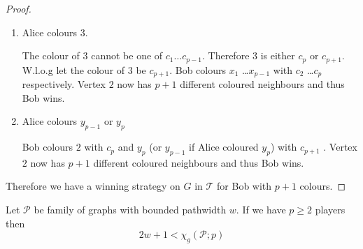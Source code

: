 \begin{proof}
\begin{enumerate}
        \item Alice colours $3$.
               
        The colour of $3$ cannot be one of $c_1 \ldots c_{p-1}$. Therefore $3$ is either $c_p$ or $c_{p+1}$. 
        W.l.o.g let the colour of $3$ be $c_{p+1}$.
        Bob colours $x_1$ \ldots $x_{p-1}$ with $c_2$ \ldots $c_{p}$ respectively.
        Vertex $2$ now has $p+1$ different coloured neighbours and thus Bob wins.  
                       
        \item Alice colours $y_{p-1}$ or $y_{p}$
        
        Bob colours $2$ with $c_p$ and $y_{p}$ (or $y_{p-1}$ if Alice coloured $y_p$) with $c_{p+1}$ .
        Vertex $2$ now has $p+1$ different coloured neighbours and thus Bob wins. 
    \end{enumerate}

    Therefore we have a winning strategy on $G$ in $\mathcal{T}$ for Bob with $p+1$ colours. 
\end{proof}

\begin{theorem}
    Let $\mathcal{P}$ be family of graphs with bounded pathwidth $w$. If we have $p\geq2$ players then \[2w+1<\chi_g(\mathcal{P};p)\]
\end{theorem}


